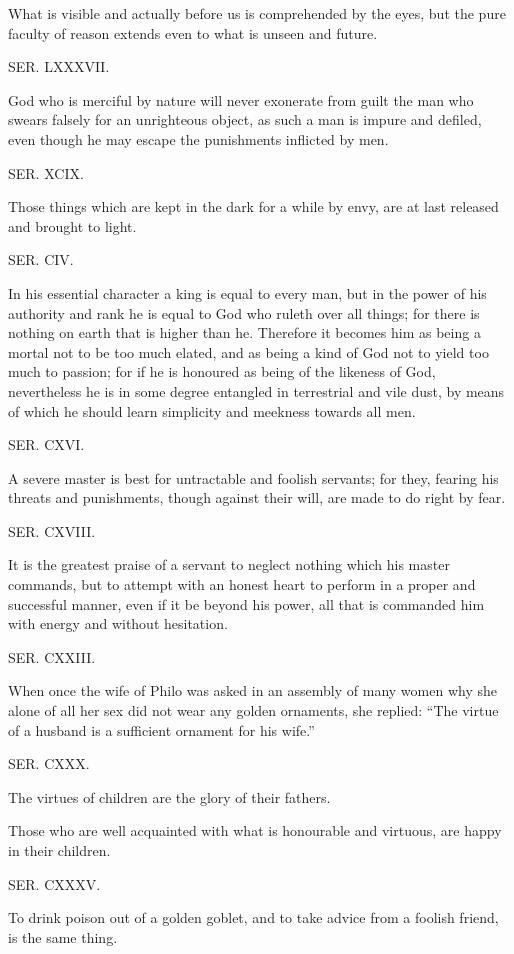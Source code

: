 What is visible and actually before us is comprehended by the eyes, but the pure faculty of reason
extends even to what is unseen and future.

SER. LXXXVII.

God who is merciful by nature will never exonerate from guilt the man who swears falsely for an
unrighteous object, as such a man is impure and defiled, even though he may escape the
punishments inflicted by men.

SER. XCIX.

Those things which are kept in the dark for a while by envy, are at last released and brought to
light.

SER. CIV.

In his essential character a king is equal to every man, but in the power of his authority and rank he
is equal to God who ruleth over all things; for there is nothing on earth that is higher than he.
Therefore it becomes him as being a mortal not to be too much elated, and as being a kind of God
not to yield too much to passion; for if he is honoured as being of the likeness of God,
nevertheless he is in some degree entangled in terrestrial and vile dust, by means of which he
should learn simplicity and meekness towards all men.

SER. CXVI.

A severe master is best for untractable and foolish servants; for they, fearing his threats and
punishments, though against their will, are made to do right by fear.

SER. CXVIII.

It is the greatest praise of a servant to neglect nothing which his master commands, but to attempt
with an honest heart to perform in a proper and successful manner, even if it be beyond his power,
all that is commanded him with energy and without hesitation.

SER. CXXIII.

When once the wife of Philo was asked in an assembly of many women why she alone of all her
sex did not wear any golden ornaments, she replied: ``The virtue of a husband is a sufficient
ornament for his wife.''

SER. CXXX.

The virtues of children are the glory of their fathers.

Those who are well acquainted with what is honourable and virtuous, are happy in their children.

SER. CXXXV.

To drink poison out of a golden goblet, and to take advice from a foolish friend, is the same thing.

